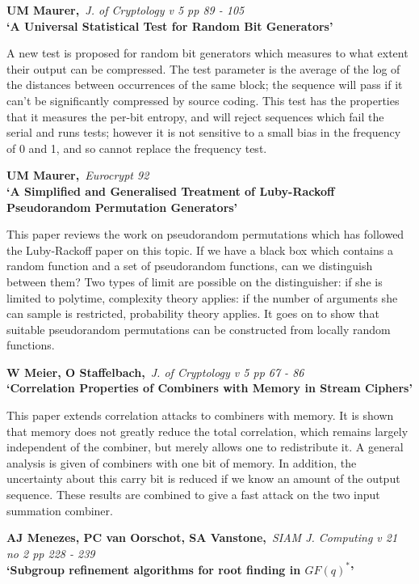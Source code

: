 {\bf \noindent UM Maurer,}{\em ~J. of Cryptology v 5 pp 89 - 105\\}
{\bf `A Universal Statistical Test for Random Bit Generators'}

A new test is proposed for random bit generators which measures to what
extent their output can be compressed. The test parameter is the average of
the log of the distances between occurrences of the same block; the sequence
will pass if it can't be significantly compressed by source coding. This test
has the properties that it measures the per-bit entropy, and will reject
sequences which fail the serial and runs tests; however it is not sensitive
to a small bias in the frequency of 0 and 1, and so cannot replace the 
frequency test.

{\bf \noindent UM Maurer,}{\em ~Eurocrypt 92\\}
{\bf `A Simplified and Generalised Treatment of Luby-Rackoff Pseudorandom
Permutation Generators'}

This paper reviews the work on pseudorandom permutations which has followed
the Luby-Rackoff paper on this topic. If we have a black box which contains
a random function and a set of pseudorandom functions, can we distinguish
between them? Two types of limit are possible on the distinguisher: if she
is limited to polytime, complexity theory applies: if the number of
arguments she can sample is restricted, probability theory applies. It goes on
to show that suitable pseudorandom permutations can be constructed from 
locally random functions.

\pagebreak

{\bf \noindent W Meier, O Staffelbach,}{\em ~J. of Cryptology v 5 pp 67 - 86\\}
{\bf `Correlation Properties of Combiners with Memory in Stream Ciphers'}

This paper extends correlation attacks to combiners with memory. It is shown
that memory does not greatly reduce the total correlation, which remains
largely independent of the combiner, but merely allows one to redistribute it.
A general analysis is given of combiners with one bit of memory. In addition,
the uncertainty about this carry bit is reduced if we know an amount of the
output sequence. These results are combined to give a fast attack on the two
input summation combiner.

{\bf \noindent AJ Menezes, PC van Oorschot, SA Vanstone,}{\em ~SIAM J.
Computing v 21 no 2 pp 228 - 239\\}
{\bf `Subgroup refinement algorithms for root finding in $GF(q)^*$'}

